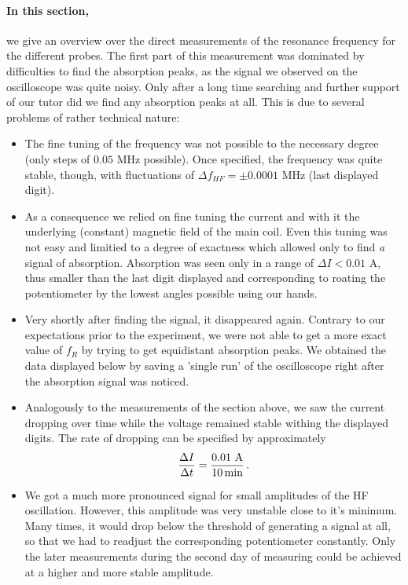 \paragraph{In this section,}
we give an overview over the direct measurements of the resonance frequency
for the different probes. The first part of this measurement was dominated by difficulties 
to find the absorption peaks, as the signal we observed on the oscilloscope was quite noisy. 
Only after a long time searching and further support of our tutor did we find any absorption 
peaks at all. This is due to several problems of rather technical nature:
\begin{itemize}
    \item
        The fine tuning of the frequency was not possible to the necessary degree (only
        steps of $0.05$ MHz possible). Once specified, the frequency was quite stable, though, 
        with fluctuations of $\Delta f_{HF} = \pm 0.0001$ MHz (last displayed digit).
    \item
        As a consequence we relied on fine tuning the 
        current and with it the underlying (constant) magnetic field of the main coil. 
        Even this tuning was not easy and limitied to a degree of exactness which 
        allowed only to find \emph{a} signal of absorption. Absorption was seen only in 
        a range of $\Delta I < 0.01$ A, thus smaller than the last digit displayed and 
        corresponding to roating the potentiometer by the lowest angles possible using our hands. 
    \item
        Very shortly after finding the signal, it disappeared again.
        Contrary to our expectations prior to the experiment, 
        we were not able to get a more exact 
        value of $f_R$ by trying to get equidistant absorption peaks. 
        We obtained the data displayed below by saving a 'single run' of the 
        oscilloscope right after the absorption signal was noticed. 
    \item 
        Analogously to the measurements of the section above, we saw the current dropping 
        over time while the voltage remained stable withing the displayed digits. 
        The rate of dropping can be specified by approximately 
        \begin{equation}
            \frac{\Delta I }{\Delta t} = \frac{0.01 \, \, \mathrm{A}}{10 \, \mathrm{min}} \, .
        \end{equation}
    \item
        We got a much more pronounced signal for small amplitudes of the HF oscillation. 
        However, this amplitude was very unstable close to it's minimum. Many times, it would 
        drop below the threshold of generating a signal at all, so that we had to readjust the 
        corresponding potentiometer constantly. Only the later measurements during the second day 
        of measuring could be achieved at a higher and more stable amplitude. 
\end{itemize}
